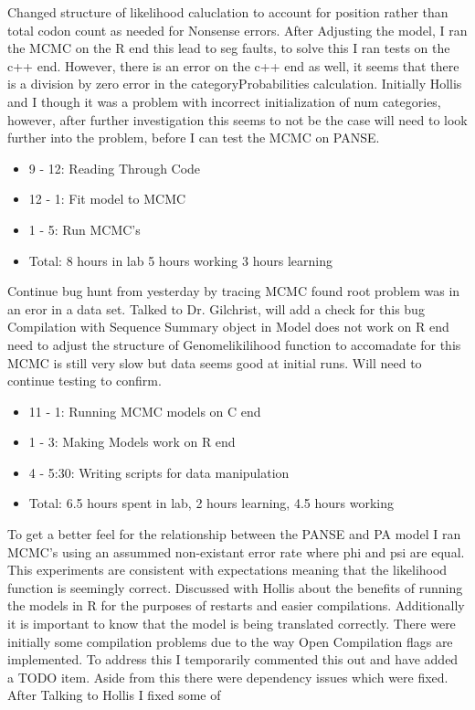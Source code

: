 \documentclass[12pt,hyperref]{labbook}
\begin{document}
Changed structure of likelihood caluclation to account for position rather than total codon count as needed for Nonsense errors.
After Adjusting the model, I ran the MCMC on the R end this lead to seg faults, to solve this I ran tests on the c++ end. However, there is an error on the c++ end as well, it seems that there is a division by zero error in the categoryProbabilities calculation. Initially Hollis and I though it was a problem with incorrect initialization of num categories, however, after further investigation this seems to not be the case will need to look further into the problem, before I can test the MCMC
on PANSE.
\begin{itemize}
    \item 9 - 12: Reading Through Code
    \item 12 - 1: Fit model to MCMC
    \item 1 - 5: Run MCMC's
    \item Total: 8 hours in lab 5 hours working 3 hours learning
\end{itemize}
Continue bug hunt from yesterday by tracing MCMC found root problem was in an eror in a data set. Talked to Dr. Gilchrist, will add a check for this bug
Compilation with Sequence Summary object in Model does not work on R end need to adjust the structure of Genomelikilihood function to accomadate for this
MCMC is still very slow but data seems good at initial runs. Will need to continue testing to confirm.
\begin{itemize}
    \item 11 - 1: Running MCMC models on C end
    \item 1 - 3: Making Models work on R end
    \item 4 - 5:30: Writing scripts for data manipulation
    \item Total: 6.5 hours spent in lab, 2 hours learning, 4.5 hours working
\end{itemize}
To get a better feel for the relationship between the PANSE and PA model I ran MCMC's using an assummed non-existant error rate where phi and psi are equal. This experiments are consistent with expectations meaning that the likelihood function is seemingly correct.
Discussed with Hollis about the benefits of running the models in R for the purposes of restarts and easier compilations. Additionally it is important to know that the model is being translated correctly. There were initially some compilation problems due to the way Open Compilation flags are implemented. To address this I temporarily commented this out and have added a TODO item. Aside from this there were dependency issues which were fixed. After Talking to Hollis I fixed some of
\end{document}
